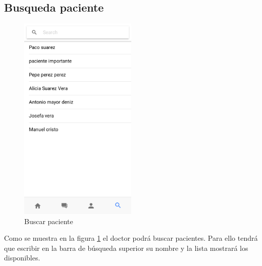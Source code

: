 \subsection{Busqueda paciente}
\begin{figure}[!h]
    \centering
    \includegraphics[width=0.5\textwidth]{images/screenshots/Doctor-buscar-pacientes.png}
    \caption{Buscar paciente}
    \label{doctor-search-patient}
\end{figure}

Como se muestra en la figura \ref{doctor-search-patient} el doctor podrá buscar
pacientes. Para ello tendrá que escribir en la barra de búsqueda superior su nombre
y la lista mostrará los disponibles.
